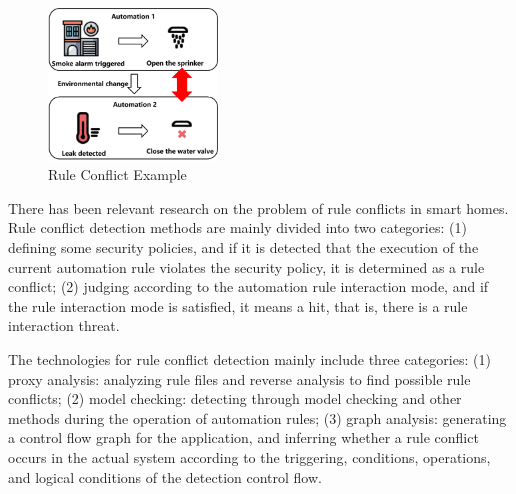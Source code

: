 \begin{figure}[htbp]
	\centering
	\includegraphics[width=0.4\textwidth]{figure/rule_conflict_example.png}
	\caption{Rule Conflict Example}
	\label{rule_conflict_example}
\end{figure}

There has been relevant research on the problem of rule conflicts in smart homes. 
Rule conflict detection methods are mainly divided into two categories: 
(1) defining some security policies, and if it is detected that the execution of the current automation rule violates the security policy, it is determined as a rule conflict; 
(2) judging according to the automation rule interaction mode, and if the rule interaction mode is satisfied, it means a hit, that is, there is a rule interaction threat. 

The technologies for rule conflict detection mainly include three categories: 
(1) proxy analysis: analyzing rule files and reverse analysis to find possible rule conflicts; 
(2) model checking: detecting through model checking and other methods during the operation of automation rules; 
(3) graph analysis: generating a control flow graph for the application, and inferring whether a rule conflict occurs in the actual system according to the triggering, conditions, operations, and logical conditions of the detection control flow. 

